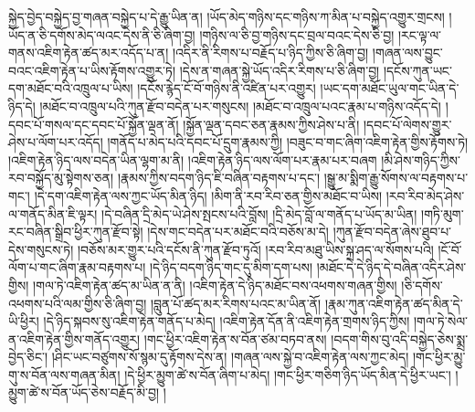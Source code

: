 སྐྱེད་བྱེད་བསྐྱེད་བྱ་གཞན་བསྐྱེད་པ་དེ་རྒྱུ་ཡིན་ན། །ཡོད་མེད་གཉིས་དང་གཉིས་ཀ་མིན་པ་བསྐྱེད་འགྱུར་གྲངས། །ཡོད་ན་ཅི་དགོས་མེད་ལའང་དེས་ནི་ཅི་ཞིག་བྱ། །གཉིས་ལ་ཅི་བྱ་གཉིས་དང་བྲལ་བའང་དེས་ཅི་བྱ། །རང་ལྟ་ལ་གནས་འཇིག་རྟེན་ཚད་མར་འདོད་པ་ན། །འདིར་ནི་རིགས་པ་བརྗོད་པ་ཉིད་ཀྱིས་ཅི་ཞིག་བྱ། །གཞན་ལས་བྱུང་བའང་འཇིག་རྟེན་པ་ཡིས་རྟོགས་འགྱུར་ཏེ། །དེས་ན་གཞན་སྐྱེ་ཡོད་འདིར་རིགས་པ་ཅི་ཞིག་བྱ། །དངོས་ཀུན་ཡང་དག་མཐོང་བའི་འཁྲུལ་པ་ཡིས། །དངོས་རྙེད་ངོ་བོ་གཉིས་ནི་འཛིན་པར་འགྱུར། །ཡང་དག་མཐོང་ཡུལ་གང་ཡིན་དེ་ཉིད་དེ། །མཐོང་བ་འཁྲུལ་པའི་ཀུན་རྫོབ་བདེན་པར་གསུངས། །མཐོང་བ་འཁྲུལ་པའང་རྣམ་པ་གཉིས་འདོད་དེ། །དབང་པོ་གསལ་དང་དབང་པོ་སྐྱོན་ལྡན་ནོ། །སྐྱོན་ལྡན་དབང་ཅན་རྣམས་ཀྱིས་ཤེས་པ་ནི། །དབང་པོ་ལེགས་གྱུར་ཤེས་པ་ལོག་པར་འདོད། །གནོད་པ་མེད་པའི་དབང་པོ་དྲུག་རྣམས་ཀྱི། །བཟུང་བ་གང་ཞིག་འཇིག་རྟེན་གྱིས་རྟོགས་ཏེ། །འཇིག་རྟེན་ཉིད་ལས་བདེན་ཡིན་ལྷག་མ་ནི། །འཇིག་རྟེན་ཉིད་ལས་ལོག་པར་རྣམ་པར་བཞག །མི་ཤེས་གཉིད་ཀྱིས་རབ་བསྐྱོད་མུ་སྟེགས་ཅན། །རྣམས་ཀྱིས་བདག་ཉིད་ཇི་བཞིན་བརྟགས་པ་དང་། །སྒྱུ་མ་སྨིག་རྒྱུ་སོགས་ལ་བརྟགས་པ་གང་། །དེ་དག་འཇིག་རྟེན་ལས་ཀྱང་ཡོད་མིན་ཉིད། །མིག་ནི་རབ་རིབ་ཅན་གྱིས་མཐོང་བ་ཡིས། །རབ་རིབ་མེད་ཤེས་ལ་གནོད་མིན་ཇི་ལྟར། །དེ་བཞིན་དྲི་མེད་ཡེ་ཤེས་སྤངས་པའི་བློས། །དྲི་མེད་བློ་ལ་གནོད་པ་ཡོད་མ་ཡིན། །གཏི་མུག་རང་བཞིན་སྒྲིབ་ཕྱིར་ཀུན་རྫོབ་སྟེ། །དེས་གང་བདེན་པར་མཐོང་བའི་བཅོས་མ་དེ། །ཀུན་རྫོབ་བདེན་ཞེས་ཐུབ་པ་དེས་གསུངས་ཏེ། །བཅོས་མར་གྱུར་པའི་དངོས་ནི་ཀུན་རྫོབ་ཏུའོ། །རབ་རིབ་མཐུ་ཡིས་སྐྲ་ཤད་ལ་སོགས་པའི། །ངོ་བོ་ལོག་པ་གང་ཞིག་རྣམ་བརྟགས་པ། །དེ་ཉིད་བདག་ཉིད་གང་དུ་མིག་དག་པས། །མཐོང་དེ་དེ་ཉིད་དེ་བཞིན་འདིར་ཤེས་གྱིས། །གལ་ཏེ་འཇིག་རྟེན་ཚད་མ་ཡིན་ན་ནི། །འཇིག་རྟེན་དེ་ཉིད་མཐོང་བས་འཕགས་གཞན་གྱིས། །ཅི་དགོས་འཕགས་པའི་ལམ་གྱིས་ཅི་ཞིག་བྱ། །བླུན་པོ་ཚད་མར་རིགས་པའང་མ་ཡིན་ནོ། །རྣམ་ཀུན་འཇིག་རྟེན་ཚད་མིན་དེ་ཡི་ཕྱིར། །དེ་ཉིད་སྐབས་སུ་འཇིག་རྟེན་གནོད་པ་མེད། །འཇིག་རྟེན་དོན་ནི་འཇིག་རྟེན་གྲགས་ཉིད་ཀྱིས། །གལ་ཏེ་སེལ་ན་འཇིག་རྟེན་གྱིས་གནོད་འགྱུར། །གང་ཕྱིར་འཇིག་རྟེན་ས་བོན་ཙམ་བཏབ་ནས། །བདག་གིས་བུ་འདི་བསྐྱེད་ཅེས་སྨྲ་བྱེད་ཅིང་། །ཤིང་ཡང་བཙུགས་སོ་སྙམ་དུ་རྟོགས་དེས་ན། །གཞན་ལས་སྐྱེ་བ་འཇིག་རྟེན་ལས་ཀྱང་མེད། །གང་ཕྱིར་མྱུ་གུ་ས་བོན་ལས་གཞན་མིན། །དེ་ཕྱིར་མྱུག་ཚེ་ས་བོན་ཞིག་པ་མེད། །གང་ཕྱིར་གཅིག་ཉིད་ཡོད་མིན་དེ་ཕྱིར་ཡང་། །མྱུག་ཚེ་ས་བོན་ཡོད་ཅེས་བརྗོད་མི་བྱ། །

